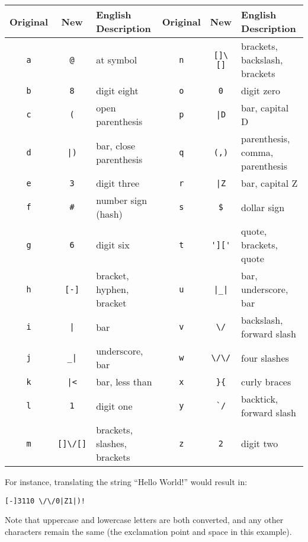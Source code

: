 \begin{center}
    \begin{tabular}{|c|c|l||c|c|l|}
        \hline
        Original & New & English Description & Original & New & English Description\\
        \hline
        \verb+a+ & \verb+@+         & at symbol                                 &  \verb+n+ & \verb+[]\[]+     & brackets, backslash, brackets\\
        \verb+b+ & \verb+8+         & digit eight                               &  \verb+o+ & \verb+0+         & digit zero \\
        \verb+c+ & \verb+(+         & open parenthesis                          &  \verb+p+ & \verb+|D+        & bar, capital D\\
        \verb+d+ & \verb+|)+        & bar, close parenthesis                    &  \verb+q+ & \verb+(,)+       & parenthesis, comma, parenthesis \\
        \verb+e+ & \verb+3+         & digit three                               &  \verb+r+ & \verb+|Z+        & bar, capital Z \\
        \verb+f+ & \verb+#+         & number sign (hash)                        &  \verb+s+ & \verb+$+         & dollar sign\\
        \verb+g+ & \verb+6+         & digit six                                 &  \verb+t+ & \verb+']['+      & quote, brackets, quote \\
        \verb+h+ & \verb+[-]+       & bracket, hyphen, bracket                  &  \verb+u+ & \verb+|_|+       & bar, underscore, bar\\
        \verb+i+ & \verb+|+         & bar                                       &  \verb+v+ & \verb+\/+        & backslash, forward slash \\
        \verb+j+ & \verb+_|+        & underscore, bar                           &  \verb+w+ & \verb+\/\/+      & four slashes \\
        \verb+k+ & \verb+|<+        & bar, less than                            &  \verb+x+ & \verb+}{+        & curly braces \\
        \verb+l+ & \verb+1+         & digit one                                 &  \verb+y+ & \verb+`/+        & backtick, forward slash\\
        \verb+m+ & \verb+[]\/[]+    & brackets, slashes, brackets               &  \verb+z+ & \verb+2+         & digit two\\
        \hline
    \end{tabular}
\end{center}
For instance, translating the string ``Hello World!'' would result in:
\begin{center}
\verb+[-]3110 \/\/0|Z1|)!+
\end{center}
Note that uppercase and lowercase letters are both converted, and any other characters remain the same (the exclamation point and space in this example).

